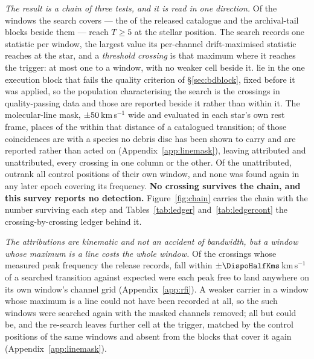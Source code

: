 \emph{The result is a chain of three tests, and it is read in one direction.}
Of the windows the search covers --- the \NWindows{} of the released
catalogue and the archival-tail blocks beside them --- \EvNCrossRaw{} reach
$T\geq5$ at the stellar position. The search records one statistic per
window, the largest value its per-channel drift-maximised statistic reaches
at the star, and a \emph{threshold crossing} is that maximum where it reaches
the trigger: at most one to a window, with no weaker cell beside it.
\EvNCrossFlag{} lie in the one
execution block that fails the quality criterion of \S\ref{sec:bdblock},
fixed before it was applied, so the population characterising the search is
the \EvNCrossQp{} crossings in quality-passing data and those
\EvNCrossFlag{} are reported beside it rather than within it. The
molecular-line mask, $\pm50$\,km\,s$^{-1}$ wide and evaluated in
each star's own rest frame, places \MkNCoinc{} of the \EvNCrossQp{} within
that distance of a catalogued transition; \MkNSODecideWord{} of those
coincidences are with a species no debris disc has been shown to carry and
are reported rather than acted on (Appendix~\ref{app:linemask}), leaving
\EvNAttrQp{} attributed and \EvNUnattrQp{} unattributed, every crossing in
one column or the other. Of the unattributed, \EvNRankQp{} outrank all
\NCtrl{} control positions of their own window, and none was found again in
any later epoch covering its frequency. \textbf{No crossing survives the chain,
and this survey reports no detection.}
Figure~\ref{fig:chain} carries the chain with the number surviving each
step and Tables~\ref{tab:ledger} and~\ref{tab:ledgercont} the
crossing-by-crossing ledger behind it.

\emph{The attributions are kinematic and not an accident of bandwidth, but a
window whose maximum is a line costs the whole window.} Of the
\AppMNCrossF{} crossings whose measured peak frequency the release records,
\AppMTubeObs{} fall within $\pm\DispoHalfKms$\,km\,s$^{-1}$ of a searched
transition against \AppMTubeNull{} expected were each peak free to land
anywhere on its own window's channel grid (Appendix~\ref{app:rfi}). A weaker
carrier in a window whose maximum is a line could not have been recorded at
all, so the \MkNCoinc{} such windows were searched again with the masked
channels removed; all but \MkNWholly{} could be, and the re-search leaves
\MkNResidTrigWord{} further cell at the trigger, matched by the control
positions of the same windows and absent from the blocks that cover it again
(Appendix~\ref{app:linemask}).


